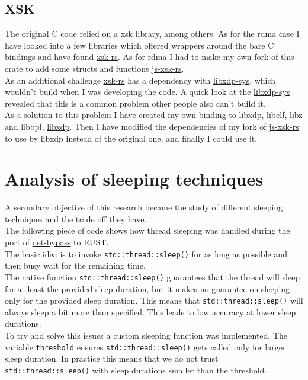 \documentclass{article}
\begin{document}
\subsection*{XSK}
The original C code relied on a xsk library, among others. As for the rdma case I have looked into a few libraries which offered wrappers around the bare C bindings and have found \href{https://github.com/DouglasGray/xsk-rs}{xsk-rs}. As for rdma I had to make my own fork of this crate to add some structs and functions \href{https://github.com/JacobSalvi/xsk-rs}{js-xsk-rs}.\\
As an additional challenge \href{https://github.com/DouglasGray/xsk-rs}{xsk-rs} has a dependency with \href{https://github.com/chenhengqi/libxdp-sys}{libxdp-sys}, which wouldn't build when I was developing the code. A quick look at the \href{https://github.com/chenhengqi/libxdp-sys}{libxdp-sys} revealed that this is a common problem other people also can't build it.\\
As a solution to this problem I have created my own binding to libxdp, libelf, libz and libbpf, \href{https://github.com/JacobSalvi/libxdp}{libxdp}. Then I have modified the dependencies of my fork of \href{https://github.com/JacobSalvi/xsk-rs}{js-xsk-rs} to use by libxdp instead of the original one, and finally I could use it.


\section*{Analysis of sleeping techniques}
A secondary objective of this research became the study of different sleeping techniques and the trade off they have.\\
The following piece of code shows how thread sleeping was handled during the port of  \href{https://github.com/swystems/det-bypass}{det-bypass} to RUST.\\
The basic idea is to invoke \texttt{std::thread::sleep()} for as long as possible and then busy wait for the remaining time. \\
The native function \texttt{std::thread::sleep()} guarantees that the thread will sleep for at least the provided sleep duration, but it makes no guarantee on sleeping only for the provided sleep duration. This means that \texttt{std::thread::sleep()} will always sleep a bit more than specified. This leads to low accuracy at lower sleep durations.\\
To try and solve this issues a custom sleeping function was implemented. The variable \texttt{threshold} ensures \texttt{std::thread::sleep()} gets called only for larger sleep duration. In practice this means that we do not trust \texttt{std::thread::sleep()} with sleep durations smaller than the threshold.\\
\end{document}
